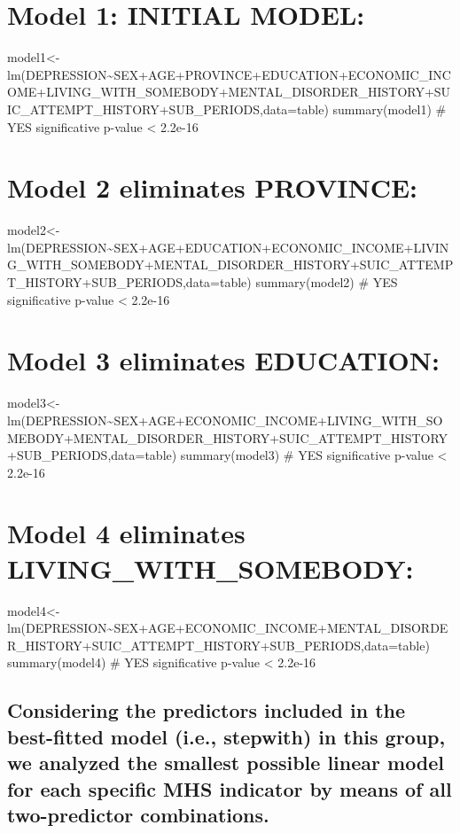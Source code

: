 \documentclass[
]{book}
\begin{document}
\hypertarget{model-1-initial-model}{%
\chapter{Model 1: INITIAL MODEL:}\label{model-1-initial-model}}

model1\textless-lm(DEPRESSION\textasciitilde SEX+AGE+PROVINCE+EDUCATION+ECONOMIC\_INCOME+LIVING\_WITH\_SOMEBODY+MENTAL\_DISORDER\_HISTORY+SUIC\_ATTEMPT\_HISTORY+SUB\_PERIODS,data=table)
summary(model1)
\# YES significative p-value \textless{} 2.2e-16

\hypertarget{model-2-eliminates-province}{%
\chapter{Model 2 eliminates PROVINCE:}\label{model-2-eliminates-province}}

model2\textless-lm(DEPRESSION\textasciitilde SEX+AGE+EDUCATION+ECONOMIC\_INCOME+LIVING\_WITH\_SOMEBODY+MENTAL\_DISORDER\_HISTORY+SUIC\_ATTEMPT\_HISTORY+SUB\_PERIODS,data=table)
summary(model2)
\# YES significative p-value \textless{} 2.2e-16

\hypertarget{model-3-eliminates-education}{%
\chapter{Model 3 eliminates EDUCATION:}\label{model-3-eliminates-education}}

model3\textless-lm(DEPRESSION\textasciitilde SEX+AGE+ECONOMIC\_INCOME+LIVING\_WITH\_SOMEBODY+MENTAL\_DISORDER\_HISTORY+SUIC\_ATTEMPT\_HISTORY+SUB\_PERIODS,data=table)
summary(model3)
\# YES significative p-value \textless{} 2.2e-16

\hypertarget{model-4-eliminates-living_with_somebody}{%
\chapter{Model 4 eliminates LIVING\_WITH\_SOMEBODY:}\label{model-4-eliminates-living_with_somebody}}

model4\textless-lm(DEPRESSION\textasciitilde SEX+AGE+ECONOMIC\_INCOME+MENTAL\_DISORDER\_HISTORY+SUIC\_ATTEMPT\_HISTORY+SUB\_PERIODS,data=table)
summary(model4)
\# YES significative p-value \textless{} 2.2e-16

\hypertarget{considering-the-predictors-included-in-the-best-fitted-model-i.e.-stepwith-in-this-group-we-analyzed-the-smallest-possible-linear-model-for-each-specific-mhs-indicator-by-means-of-all-two-predictor-combinations.}{%
\section{Considering the predictors included in the best-fitted model (i.e., stepwith) in this group, we analyzed the smallest possible linear model for each specific MHS indicator by means of all two-predictor combinations.}\label{considering-the-predictors-included-in-the-best-fitted-model-i.e.-stepwith-in-this-group-we-analyzed-the-smallest-possible-linear-model-for-each-specific-mhs-indicator-by-means-of-all-two-predictor-combinations.}}
\end{document}
